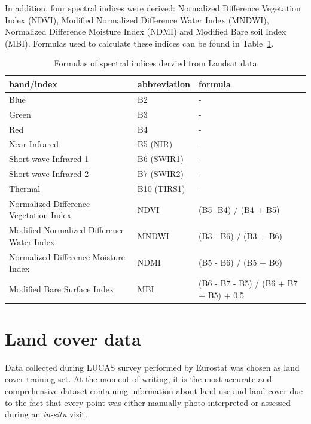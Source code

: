 \documentclass{amuthesis}
\begin{document}
In addition, four spectral indices were derived: Normalized Difference
Vegetation Index (NDVI), Modified Normalized Difference Water Index
(MNDWI), Normalized Difference Moisture Index (NDMI) and Modified Bare
soil Index (MBI). Formulas used to calculate these indices can be found
in Table~\ref{tbl-tabela1}.

\hypertarget{tbl-tabela1}{}
\begin{table}
\caption{\label{tbl-tabela1}Formulas of spectral indices dervied from Landsat data }\tabularnewline

\centering
\begin{tabular}{|>{\raggedright\arraybackslash}p{4cm}|>{}l|>{}l|}
\toprule
\textbf{band/index} & \textbf{abbreviation} & \textbf{formula}\\
\midrule
Blue & B2 & -\\
\hline
Green & B3 & -\\
\hline
Red & B4 & -\\
\hline
Near Infrared & B5 (NIR) & -\\
\hline
Short-wave Infrared 1 & B6 (SWIR1) & -\\
\hline
Short-wave Infrared 2 & B7 (SWIR2) & -\\
\hline
Thermal & B10 (TIRS1) & -\\
\hline
Normalized Difference Vegetation Index & NDVI & (B5 -B4) / (B4 + B5)\\
\hline
Modified Normalized Difference Water Index & MNDWI & (B3 - B6) / (B3 + B6)\\
\hline
Normalized Difference Moisture Index & NDMI & (B5 - B6) / (B5 + B6)\\
\hline
Modified Bare Surface Index & MBI & (B6 - B7 - B5) / (B6 + B7 + B5) + 0.5\\
\bottomrule
\end{tabular}
\end{table}

\hypertarget{sec-landcover}{%
\section{Land cover data}\label{sec-landcover}}

Data collected during LUCAS survey performed by Eurostat was chosen as
land cover training set. At the moment of writing, it is the most
accurate and comprehensive dataset containing information about land use
and land cover \autocite{pflugmacher_mapping_2019} due to the fact that
every point was either manually photo-interpreted or assessed during an
\emph{in-situ} visit.
\end{document}

